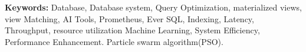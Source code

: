 
\noindent \textbf{Keywords:} Database, Database system, Query Optimization, materialized views, view Matching, AI Tools, Prometheus, Ever SQL, Indexing, Latency, Throughput, resource utilization Machine Learning, System Efficiency, Performance Enhancement. Particle swarm algorithm(PSO).

 


